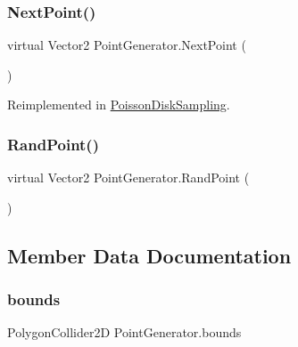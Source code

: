 \subsubsection{\texorpdfstring{Next\+Point()}{NextPoint()}}
{\footnotesize\ttfamily virtual Vector2 Point\+Generator.\+Next\+Point (\begin{DoxyParamCaption}{ }\end{DoxyParamCaption})\hspace{0.3cm}{\ttfamily [virtual]}}



Reimplemented in \mbox{\hyperlink{class_poisson_disk_sampling_a6e0e9060e58c98193329d0661a64a5ed}{Poisson\+Disk\+Sampling}}.

\mbox{\label{class_point_generator_a58500ea3c2c04ee376b6f85e53c65509}} 
\subsubsection{\texorpdfstring{Rand\+Point()}{RandPoint()}}
{\footnotesize\ttfamily virtual Vector2 Point\+Generator.\+Rand\+Point (\begin{DoxyParamCaption}{ }\end{DoxyParamCaption})\hspace{0.3cm}{\ttfamily [virtual]}}



\subsection{Member Data Documentation}
\mbox{\label{class_point_generator_ade370757db1179941702a6eb1944d6ea}} 
\subsubsection{\texorpdfstring{bounds}{bounds}}
{\footnotesize\ttfamily Polygon\+Collider2D Point\+Generator.\+bounds}

\mbox{\label{class_point_generator_a8ab671e3c028583108b4e90425a49b6b}} 
